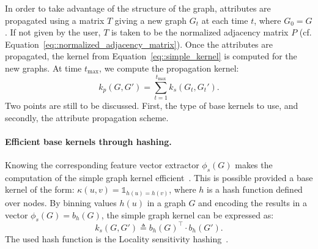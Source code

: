             In order to take advantage of the structure of the graph, attributes are propagated using a matrix $T$ giving a new graph $G_t$ at each time $t$, where $G_0 = G$.
            If not given by the user, \(T\) is taken to be the normalized adjacency matrix $P$ (cf. Equation~\ref{eq::normalized_adjacency_matrix}).
            Once the attributes are propagated, the kernel from Equation~\ref{eq::simple_kernel} is computed for the new graphs.
            At time $t_{\max}$, we compute the propagation kernel:
            \begin{equation}
                \label{eq::propagation_kernel}
                k_p(G, G') = \sum_{t=1}^{t_{\max}} k_s(G_t, G_t').
            \end{equation}
            Two points are still to be discussed.
            First, the type of base kernels to use, and secondly, the attribute propagation scheme.\\
            
            \paragraph{Efficient base kernels through hashing.}
            Knowing the corresponding feature vector extractor $\phi_s(G)$ makes the computation of the simple graph kernel efficient~\parencite{shervashidze2011weisfeiler,neumann2016propagation}.
            This is possible provided a base kernel of the form: $\kappa(u, v) = \mathbb{1}_{h(u) = h(v)}$, where $h$ is a hash function defined over nodes.
            By binning values $h(u)$ in a graph $G$ and encoding the results in a vector $\phi_s(G) = b_h(G)$, the simple graph kernel can be expressed as:
            \begin{equation}
                \label{eq::simple_kernel_binning}
                k_s(G, G') \triangleq b_h(G)^\intercal\cdot b_h(G').
            \end{equation}
            The used hash function is the Locality sensitivity hashing~\parencite{neumann2016propagation}.\\
            
